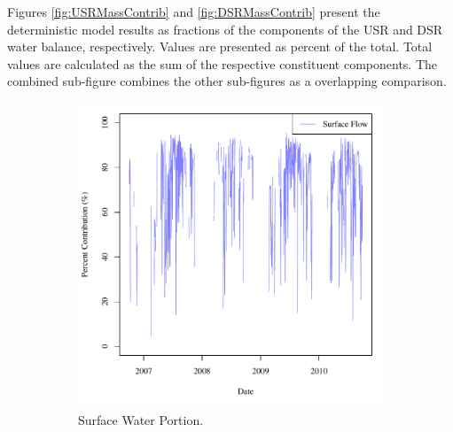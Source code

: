 \begin{linenumbers}
Figures \ref{fig:USRMassContrib} and \ref{fig:DSRMassContrib} present the deterministic model results as fractions of the components of the USR and DSR water balance, respectively.  Values are presented as percent of the total.  Total values are calculated as the sum of the respective constituent components.  The combined sub-figure combines the other sub-figures as a overlapping comparison.  

\begin{figure}[htbp]
	\centering
	\begin{subfigure}{0.5\textwidth}
		\centering
		\includegraphics[width=\tableCustomSize]{"Figures/Results_USR/Stochastic/M Mass Contrib 1"}
		\caption{Surface Water Portion.}
	\end{subfigure}%
	\begin{subfigure}{0.5\textwidth}
		\centering

\end{subfigure}
\end{figure}
\end{linenumbers}
